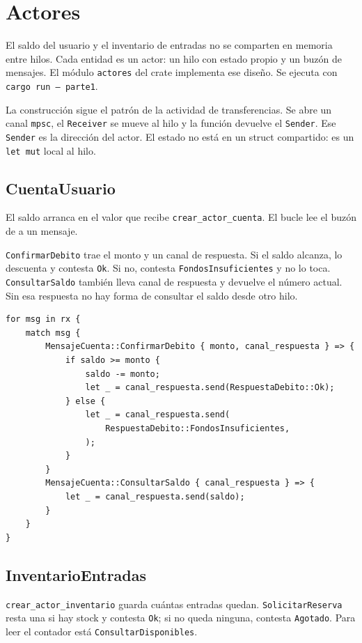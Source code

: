 \section{Actores}

El saldo del usuario y el inventario de entradas no se comparten en
memoria entre hilos. Cada entidad es un actor: un hilo con estado propio
y un buzón de mensajes. El módulo \texttt{actores} del crate implementa
ese diseño. Se ejecuta con \texttt{cargo run -- parte1}.

La construcción sigue el patrón de la actividad de transferencias. Se
abre un canal \texttt{mpsc}, el \texttt{Receiver} se mueve al hilo y la
función devuelve el \texttt{Sender}. Ese \texttt{Sender} es la dirección
del actor. El estado no está en un struct compartido: es un
\texttt{let mut} local al hilo.

\subsection{CuentaUsuario}

El saldo arranca en el valor que recibe \texttt{crear\_actor\_cuenta}. El
bucle lee el buzón de a un mensaje.

\texttt{ConfirmarDebito} trae el monto y un canal de respuesta. Si el
saldo alcanza, lo descuenta y contesta \texttt{Ok}. Si no, contesta
\texttt{FondosInsuficientes} y no lo toca. \texttt{ConsultarSaldo}
también lleva canal de respuesta y devuelve el número actual. Sin esa
respuesta no hay forma de consultar el saldo desde otro hilo.

\begin{lstlisting}
for msg in rx {
    match msg {
        MensajeCuenta::ConfirmarDebito { monto, canal_respuesta } => {
            if saldo >= monto {
                saldo -= monto;
                let _ = canal_respuesta.send(RespuestaDebito::Ok);
            } else {
                let _ = canal_respuesta.send(
                    RespuestaDebito::FondosInsuficientes,
                );
            }
        }
        MensajeCuenta::ConsultarSaldo { canal_respuesta } => {
            let _ = canal_respuesta.send(saldo);
        }
    }
}
\end{lstlisting}

\subsection{InventarioEntradas}

\texttt{crear\_actor\_inventario} guarda cuántas entradas quedan.
\texttt{SolicitarReserva} resta una si hay stock y contesta \texttt{Ok};
si no queda ninguna, contesta \texttt{Agotado}. Para leer el contador
está \texttt{ConsultarDisponibles}.

